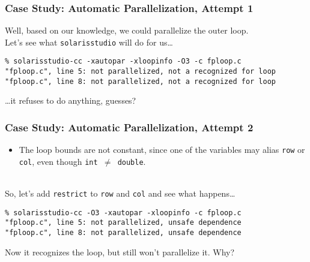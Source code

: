 \begin{frame}[fragile]
  \frametitle{Case Study: Automatic Parallelization, Attempt 1}

  
  Well, based on our knowledge, we could parallelize the outer loop.\\[1em]
  Let's see what {\tt solarisstudio} will do for us\ldots
  

  \begin{lstlisting}
% solarisstudio-cc -xautopar -xloopinfo -O3 -c fploop.c
"fploop.c", line 5: not parallelized, not a recognized for loop
"fploop.c", line 8: not parallelized, not a recognized for loop
  \end{lstlisting}

  
  \ldots it refuses to do anything, guesses?
  

\end{frame}

\begin{frame}[fragile]
  \frametitle{Case Study: Automatic Parallelization, Attempt 2}


  \begin{itemize}
    \item The loop bounds are not constant, since one of the variables may alias
      {\tt row} or {\tt col}, even though {\tt int $\neq$ double}.
  \end{itemize}
~\\[1em]

  So, let's add {\tt restrict} to {\tt row} and {\tt col} and see what
  happens\ldots

  \begin{lstlisting}
% solarisstudio-cc -O3 -xautopar -xloopinfo -c fploop.c
"fploop.c", line 5: not parallelized, unsafe dependence
"fploop.c", line 8: not parallelized, unsafe dependence
  \end{lstlisting}

  Now it recognizes the loop, but still won't parallelize it. Why?


\end{frame}

